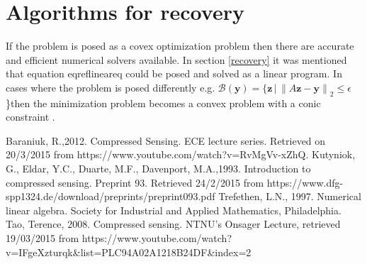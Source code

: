 \documentclass[11pt,twoside,a4paper]{article}
\begin{document}
\section{Algorithms for recovery}
If the problem is posed as a covex optimization problem then there are accurate and efficient numerical solvers available. In section \ref{recovery} it was mentioned that equation eqref{lineareq} could be posed and solved as a linear program. In cases where the problem is posed differently e.g. $\mathcal{B}(\mathbf{y})=\{\mathbf{z}\, \vert \, {\lVert A\mathbf{z}-\mathbf{y}\rVert}_2\leq\epsilon$\}then the minimization problem becomes a convex problem with a conic constraint \cite{GK}.

\newpage
\begin{thebibliography}{99}
Baraniuk, R.,2012. Compressed Sensing. ECE lecture series. Retrieved on 20/3/2015 from https://www.youtube.com/watch?v=RvMgVv-xZhQ.
Kutyniok, G., Eldar, Y.C., Duarte, M.F., Davenport, M.A.,1993. Introduction to compressed sensing. Preprint 93. Retrieved 24/2/2015 from https://www.dfg-spp1324.de/download/preprints/preprint093.pdf 
Trefethen, L.N., 1997. Numerical linear algebra. Society for Industrial and Applied Mathematics, Philadelphia.
Tao, Terence, 2008. Compressed sensing. NTNU's Onsager Lecture, retrieved 19/03/2015 from  https://www.youtube.com/watch?v=IFgeXzturqk\&list=PLC94A02A1218B24DF\&index=2

\end{thebibliography}
\end{document}

